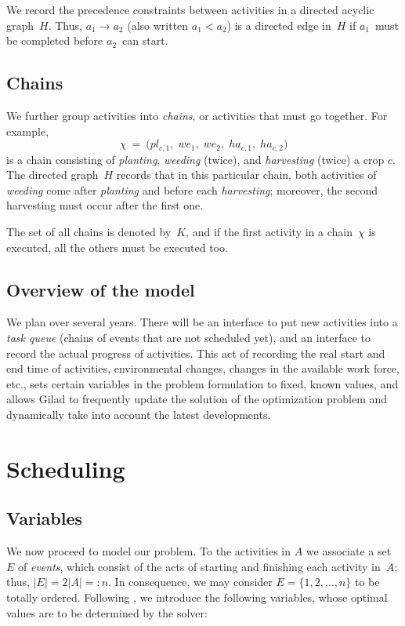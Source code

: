 \documentclass[11pt,reqno]{amsart}
\newcommand{\lra}{\longrightarrow}
\numberwithin{equation}{section}
\begin{document}
We record the precedence constraints between  activities in a directed acyclic
graph~$H$. Thus, $a_1\lra a_2$ (also written $a_1<a_2$) is a directed edge
in~$H$ if $a_1$~must be completed before $a_2$~can start. 

\subsection{Chains}
We further group activities into \emph{chains}, or activities that must go
together. For example,
\[
   \chi
   \ = \
   \big(pl_{c,1}, \;
    we_{1},\;
    we_{2},\;
    ha_{c,1},\;
    ha_{c,2}\big)
\]
is a chain consisting of \emph{planting}, \emph{weeding} (twice), and \emph{harvesting}
(twice) a crop $c$. The directed graph~$H$ records that in this particular chain, both
activities of \emph{weeding} come after \emph{planting} and before each \emph{harvesting};
moreover, the second harvesting must occur after the first one.

The set of all chains is denoted by~$K$, and if the first activity in a chain~$\chi$ is
executed, all the others must be executed too.



\subsection{Overview of the model}

We plan over several years. There will be an interface to put new activities into a
\emph{task queue} (chains of events that are not scheduled yet), and an interface to
record the actual progress of activities. This act of recording the real start and end
time of activities, environmental changes, changes in the available work force, etc., sets
certain variables in the problem formulation to fixed, known values, and allows Gilad to
frequently update the solution of the optimization problem and dynamically take into
account the latest developments.

\section{Scheduling}

\subsection{Variables}

We now proceed to model our problem.  To the activities in $A$ we associate a set~$E$ of
\emph{events}, which consist of the acts of starting and finishing each activity in~$A$;
thus, $|E|=2|A|=:n$. In consequence, we may consider $E=\{1,2,\dots, n\}$ to be
totally ordered.  Following \cite{artigues-etal11}, we introduce the following variables,
whose optimal values are to be determined by the solver:
\end{document}
